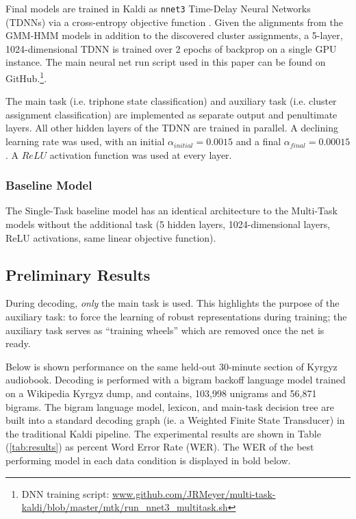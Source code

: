\documentclass[a4paper]{article}
\begin{document}
Final models are trained in Kaldi as \texttt{nnet3} Time-Delay Neural Networks (TDNNs) via a cross-entropy objective function \cite{povey2011,peddinti2015}. Given the alignments from the GMM-HMM models in addition to the discovered cluster assignments, a 5-layer, 1024-dimensional TDNN is trained over 2 epochs of backprop on a single GPU instance. The main neural net run script used in this paper can be found on GitHub.\footnote{DNN training script: \url{www.github.com/JRMeyer/multi-task-kaldi/blob/master/mtk/run_nnet3_multitask.sh}}.

The main task (i.e. triphone state classification) and auxiliary task (i.e. cluster assignment classification) are implemented as separate output and penultimate layers. All other hidden layers of the TDNN are trained in parallel. A declining learning rate was used, with an initial $\alpha_{initial}=0.0015$ and a final $\alpha_{final}=0.00015$. A $ReLU$ activation function was used at every layer.


\subsubsection{Baseline Model}

The Single-Task baseline model has an identical architecture to the Multi-Task models without the additional task (5 hidden layers, 1024-dimensional layers, ReLU activations, same linear objective function).



\subsection{Preliminary Results}

 During decoding, \textit{only} the main task is used. This highlights the purpose of the auxiliary task: to force the learning of robust representations during training; the auxiliary task serves as ``training wheels'' which are removed once the net is ready.

Below is shown performance on the same held-out 30-minute section of Kyrgyz audiobook. Decoding is performed with a bigram backoff language model trained on a Wikipedia Kyrgyz dump, and contains, 103,998 unigrams and 56,871 bigrams. The bigram language model, lexicon, and main-task decision tree are built into a standard decoding graph (ie. a Weighted Finite State Transducer) in the traditional Kaldi pipeline. The experimental results are shown in Table (\ref{tab:results}) as percent Word Error Rate (WER). The WER of the best performing model in each data condition is displayed in bold below.
\end{document}

